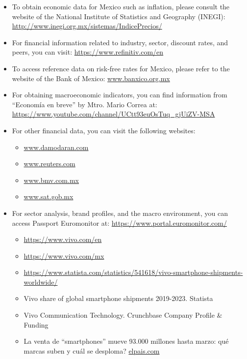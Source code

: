 \begin{itemize}

\item To obtain economic data for Mexico such as inflation, please consult the website of the National Institute of Statistics and Geography (INEGI): \url{http://www.inegi.org.mx/sistemas/IndicePrecios/}

\item For financial information related to industry, sector, discount rates, and peers, you can visit: \url{https://www.refinitiv.com/en}

\item To access reference data on risk-free rates for Mexico, please refer to the website of the Bank of Mexico: \url{www.banxico.org.mx}

\item For obtaining macroeconomic indicators, you can find information from ``Economía en breve'' by Mtro. Mario Correa at: \url{https://www.youtube.com/channel/UCtt93euOsTuq_gjUiZV-MSA}

\item For other financial data, you can visit the following websites:
\begin{itemize}
\item\url{www.damodaran.com}
\item \url{www.reuters.com}
\item \url{www.bmv.com.mx}
\item \url{www.sat.gob.mx}
\end{itemize}

\item For sector analysis, brand profiles, and the macro environment, you can access Passport Euromonitor at: \url{https://www.portal.euromonitor.com/}
\begin{itemize}
\item \url{https://www.vivo.com/en}
\item \url{https://www.vivo.com/mx}
\item \url{https://www.statista.com/statistics/541618/vivo-smartphone-shipments-worldwide/}
\item Vivo share of global smartphone shipments 2019-2023. Statista
\item Vivo Communication Technology. Crunchbase Company Profile \& Funding
\item La venta de ``smartphones'' mueve 93.000 millones hasta marzo: qué marcas suben y cuál se desploma? \url{elpais.com}
\end{itemize}
	 
\end{itemize}